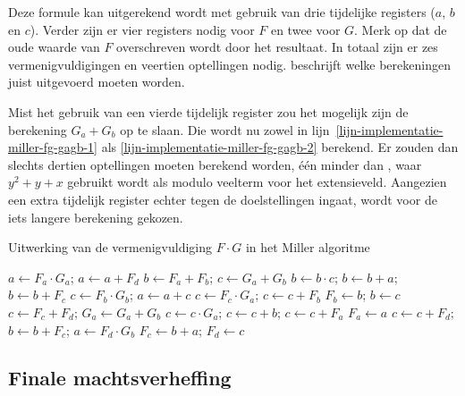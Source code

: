Deze formule kan uitgerekend wordt met gebruik van drie tijdelijke registers ($a$, $b$ en $c$). Verder zijn er vier registers nodig voor $F$ en twee voor $G$. Merk op dat de oude waarde van $F$ overschreven wordt door het resultaat. In totaal zijn er zes vermenigvuldigingen en veertien optellingen nodig.  beschrijft welke berekeningen juist uitgevoerd moeten worden.

Mist het gebruik van een vierde tijdelijk register zou het mogelijk zijn de berekening $G_a + G_b$ op te slaan. Die wordt nu zowel in lijn~\ref{lijn-implementatie-miller-fg-gagb-1} als \ref{lijn-implementatie-miller-fg-gagb-2} berekend. Er zouden dan slechts dertien optellingen moeten berekend worden, \'e\'en minder dan \cite{beuchat}, waar $y^2 + y +x$ gebruikt wordt als modulo veelterm voor het extensieveld. Aangezien een extra tijdelijk register echter tegen de doelstellingen ingaat, wordt voor de iets langere berekening gekozen.

\begin{algorithm}[h]
	\caption{Uitwerking van de vermenigvuldiging $F \cdot G$ in het Miller algoritme}
	\label{algoritme-implementatie-miller-fg}
	$a \leftarrow F_a \cdot G_a$; $a \leftarrow a + F_d$\;
	$b \leftarrow F_a + F_b$; $c \leftarrow G_a + G_b$\;
	$b \leftarrow b \cdot c$; $b \leftarrow b + a$; $b \leftarrow b + F_c$\;
	$c \leftarrow F_b \cdot G_b$; $a \leftarrow a + c$\;
	$c \leftarrow F_c \cdot G_a$;	$c \leftarrow c + F_b$\;
	$F_b \leftarrow b$; $b \leftarrow c$\;
	$c \leftarrow F_c + F_d$; $G_a \leftarrow G_a + G_b$\;
	$c \leftarrow c \cdot G_a$; $c \leftarrow c + b$; $c \leftarrow c + F_a$\;
	$F_a \leftarrow a$\;
	$c \leftarrow c + F_d$; $b \leftarrow b + F_c$; $a \leftarrow F_d \cdot G_b$\;
	$F_c \leftarrow b + a$; $F_d \leftarrow c$\;
\end{algorithm}

\subsection{Finale machtsverheffing\label{subsectie-implementatie-miller-finale-exp}}


